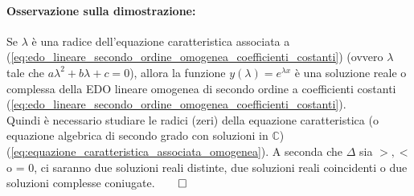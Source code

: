 \paragraph{Osservazione sulla dimostrazione:} Se $\lambda$ è una radice dell'equazione caratteristica associata a (\ref{eq:edo_lineare_secondo_ordine_omogenea_coefficienti_costanti}) (ovvero $\lambda$ tale che $a\lambda^2 + b\lambda + c= 0$), allora la funzione $y(\lambda)=e^{\lambda x}$ è una soluzione reale o complessa della EDO lineare omogenea di secondo ordine a coefficienti costanti (\ref{eq:edo_lineare_secondo_ordine_omogenea_coefficienti_costanti}).\\
Quindi è necessario studiare le radici (zeri) della equazione caratteristica (o equazione algebrica di secondo grado con soluzioni in $\mathbb{C}$) (\ref{eq:equazione_caratteristica_associata_omogenea}). A seconda che $\Delta$ sia $>, <$ o = 0, ci saranno due soluzioni reali distinte, due soluzioni reali coincidenti o due soluzioni complesse coniugate.$\qed$


